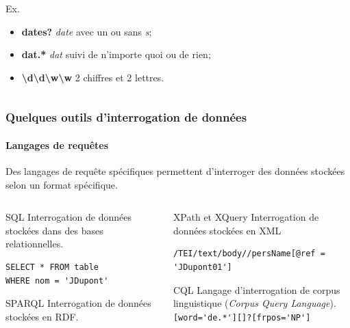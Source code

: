 \documentclass[ignorenonframetext]{beamer}
\begin{document}
\begin{frame}[fragile]
\begin{columns}
\begin{column}{0.53\textwidth}
		\begin{block}{Ex.}
			\begin{itemize}
				\item \textbf{dates?} \textit{date} avec un ou sans \textit{s};
				\item \textbf{dat.*} \textit{dat} suivi de n'importe quoi ou de rien;
				\item \textbf{\textbackslash{}d\textbackslash{}d\textbackslash{}w\textbackslash{}w} 2 chiffres et 2 lettres.
			\end{itemize}
		\end{block}
		
		\end{column}
	\end{columns}
	
\end{frame}


\begin{frame}[fragile]
\frametitle{Quelques outils d'interrogation de données}
\framesubtitle{Langages de requêtes}

Des langages de requête spécifiques permettent d'interroger des données stockées selon un format spécifique.

	\begin{columns}
	\begin{column}{0.43\textwidth}
		\begin{block}{SQL}
			Interrogation de données stockées dans des bases relationnelles.
\begin{verbatim}
SELECT * FROM table 
WHERE nom = 'JDupont'
\end{verbatim}
		\end{block}
	\begin{block}{SPARQL}
		Interrogation de données stockées en RDF.
	\end{block}
	\end{column}
	\begin{column}{0.55\textwidth}
		\begin{block}{XPath et XQuery}
			Interrogation de données stockées en XML
\begin{verbatim}
/TEI/text/body//persName[@ref = 'JDupont01']
\end{verbatim}
		\end{block}
	\begin{block}{CQL}
		Langage d'interrogation de corpus linguistique (\textit{Corpus Query Language}).\\
		\verb|[word='de.*'][]?[frpos='NP']|
	\end{block}
	
	\end{column}
\end{columns}


\end{frame}
\end{document}
